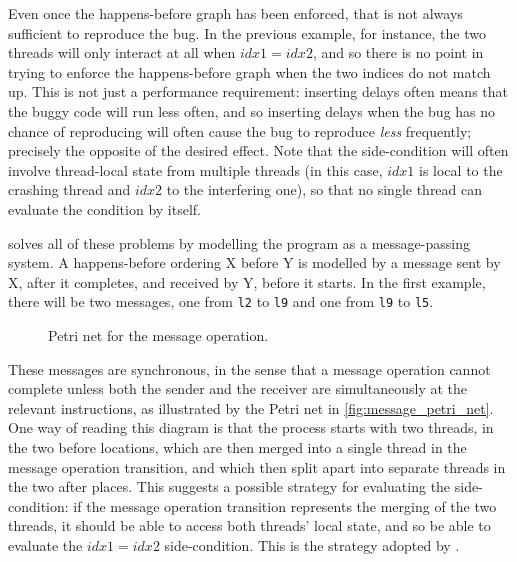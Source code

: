 Even once the happens-before graph has been enforced, that is not
always sufficient to reproduce the bug.  In the previous example, for
instance, the two threads will only interact at all when
$\mathit{idx1} = \mathit{idx2}$, and so there is no point in trying to
enforce the happens-before graph when the two indices do not match up.
This is not just a performance requirement: inserting delays often
means that the buggy code will run less often, and so inserting delays
when the bug has no chance of reproducing will often cause the bug to
reproduce \emph{less} frequently; precisely the opposite of the
desired effect.  Note that the side-condition will often involve
thread-local state from multiple threads (in this case,
$\mathit{idx1}$ is local to the crashing thread and $\mathit{idx2}$ to
the interfering one), so that no single thread can evaluate the
condition by itself.

\Technique{} solves all of these problems by modelling the program as
a message-passing system.  A happens-before ordering X before Y is
modelled by a message sent by X, after it completes, and received by
Y, before it starts.  In the first example, there will be two
messages, one from \texttt{l2} to \texttt{l9} and one from \texttt{l9}
to \texttt{l5}.

\begin{wrapfigure}{r}{6cm}
  \vspace{-17pt}
  \caption{Petri net for the message operation.}
  \label{fig:message_petri_net}
  \vspace{-20pt}
\end{wrapfigure}
These messages are synchronous, in the sense that a message operation
cannot complete unless both the sender and the receiver are
simultaneously at the relevant instructions, as illustrated by the
Petri net in \autoref{fig:message_petri_net}.  One way of reading this
diagram is that the process starts with two threads, in the two before
locations, which are then merged into a single thread in the message
operation transition, and which then split apart into separate threads
in the two after places.  This suggests a possible strategy for
evaluating the side-condition: if the message operation transition
represents the merging of the two threads, it should be able to access
both threads' local state, and so be able to evaluate the
$\mathit{idx1} = \mathit{idx2}$ side-condition.  This is the strategy
adopted by {\technique}.

